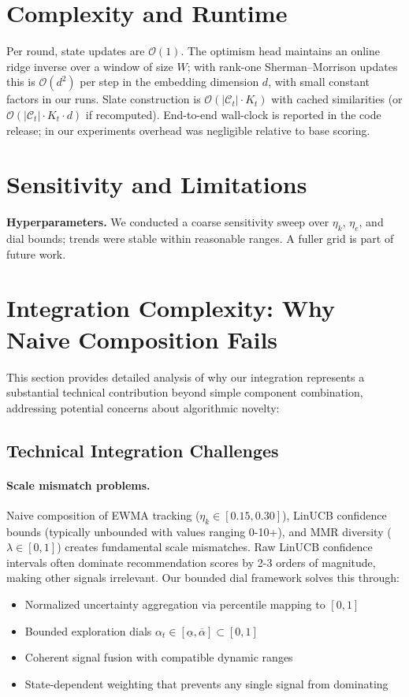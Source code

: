 \section{Complexity and Runtime}
\label{app:complexity}
Per round, state updates are $\mathcal{O}(1)$. The optimism head maintains an online ridge inverse over a window of size $W$; with rank-one Sherman–Morrison updates this is $\mathcal{O}(d^2)$ per step in the embedding dimension $d$, with small constant factors in our runs. Slate construction is $\mathcal{O}(|\mathcal{C}_t|\cdot K_t)$ with cached similarities (or $\mathcal{O}(|\mathcal{C}_t|\cdot K_t\cdot d)$ if recomputed). End-to-end wall-clock is reported in the code release; in our experiments overhead was negligible relative to base scoring.

\section{Sensitivity and Limitations}
\label{app:limits}
\textbf{Hyperparameters.} We conducted a coarse sensitivity sweep over $\eta_k$, $\eta_e$, and dial bounds; trends were stable within reasonable ranges. A fuller grid is part of future work.

\section{Integration Complexity: Why Naive Composition Fails}
\label{app:integration}

This section provides detailed analysis of why our integration represents a substantial technical contribution beyond simple component combination, addressing potential concerns about algorithmic novelty:

\subsection{Technical Integration Challenges}
\label{app:integration-challenges}

\paragraph{Scale mismatch problems.} Naive composition of EWMA tracking ($\eta_k \in [0.15, 0.30]$), LinUCB confidence bounds (typically unbounded with values ranging 0-10+), and MMR diversity ($\lambda \in [0,1]$) creates fundamental scale mismatches. Raw LinUCB confidence intervals often dominate recommendation scores by 2-3 orders of magnitude, making other signals irrelevant. Our bounded dial framework solves this through:
\begin{itemize}
  \item Normalized uncertainty aggregation via percentile mapping to $[0,1]$
  \item Bounded exploration dials $\alpha_t \in [\underline{\alpha}, \overline{\alpha}] \subset [0,1]$
  \item Coherent signal fusion with compatible dynamic ranges
  \item State-dependent weighting that prevents any single signal from dominating
\end{itemize}

